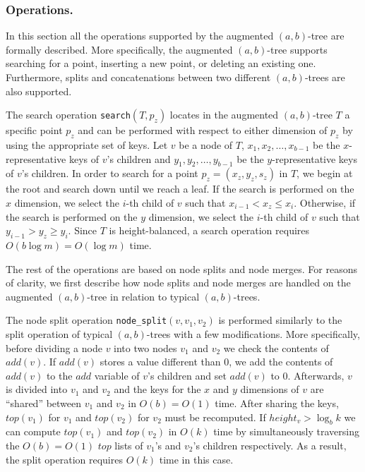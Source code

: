 \documentclass{llncs}
\begin{document}
\vspace{-0.5cm}
\subsubsection{Operations.} \label{subsubsection:AugABTreeOperations}
In this section all the operations supported by the augmented $(a,b)$-tree are formally described. More specifically, the augmented $(a,b)$-tree supports searching for a point, inserting a new point, or deleting an existing one. Furthermore, splits and concatenations between two different $(a,b)$-trees are also supported.

The search operation \texttt{search$(T,p_z)$} locates in the augmented $(a,b)$-tree $T$ a specific point $p_z$ and can be performed with respect to either dimension of $p_z$ by using the appropriate set of keys. Let $v$ be a node of $T$, $x_1, x_2, \ldots, x_{b-1}$ be the $x$-representative keys of $v$'s children and $y_1, y_2, \ldots, y_{b-1}$ be the $y$-representative keys of $v$'s children. In order to search for a point $p_z=(x_{z},y_{z},s_z)$ in $T$, we begin at the root and search down until we reach a leaf. If the search is performed on the $x$ dimension, we select the $i$-th child of $v$ such that $x_{i-1} < x_z \leq x_i$. Otherwise, if the search is performed on the $y$ dimension, we select the $i$-th child of $v$ such that $y_{i-1} > y_z \geq y_i$. Since $T$ is height-balanced, a search operation requires $O(b\log m)=O(\log m)$ time.

The rest of the operations are based on node splits and node merges. For reasons of clarity, we first describe how node splits and node merges are handled on the augmented $(a,b)$-tree in relation to typical $(a,b)$-trees.

The node split operation \texttt{node\_split$(v,v_1,v_2)$} is performed similarly to the split operation of typical $(a,b)$-trees with a few modifications. More specifically, before dividing a node $v$ into two nodes $v_1$ and $v_2$ we check the contents of $add(v)$. If $add(v)$ stores a value different than $0$, we add the contents of $add(v)$ to the $add$ variable of $v$'s children and set $add(v)$ to $0$. Afterwards, $v$ is divided into $v_1$ and $v_2$ and the keys for the $x$ and $y$ dimensions of $v$ are ``shared'' between $v_1$ and $v_2$ in $O(b)=O(1)$ time. After sharing the keys, $top(v_1)$ for $v_1$ and $top(v_2)$ for $v_2$ must be recomputed. If $height_v > \log_{b}k$ we can compute $top(v_1)$ and $top(v_2)$ in $O(k)$ time by simultaneously traversing the $O(b)=O(1)$ $top$ lists of $v_1$'s and $v_2$'s children respectively. As a result, the split operation requires $O(k)$ time in this case.
\end{document}
